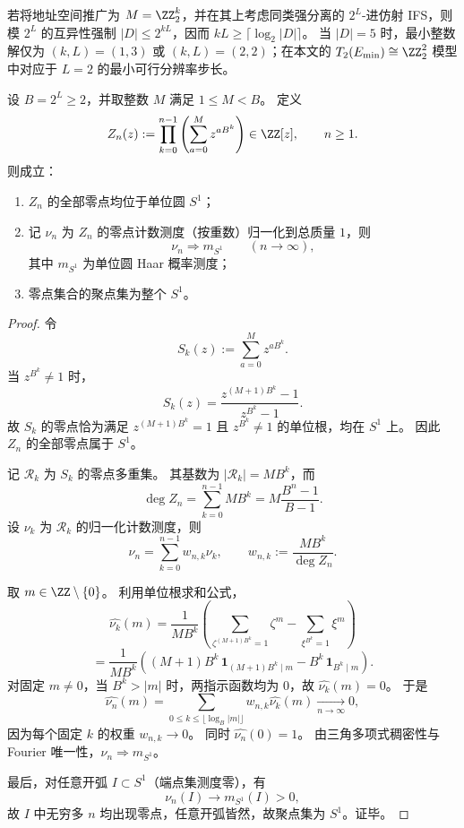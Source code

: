 \begin{remark}[强分离资源的离散门槛]\label{rem:conclusion-godel-leyang-five-digit-quantization}
若将地址空间推广为 \(M=\ZZ_2^k\)，并在其上考虑同类强分离的 \(2^L\)-进仿射 IFS，则模 \(2^L\) 的互异性强制 \(|D|\le 2^{kL}\)，因而 \(kL\ge \lceil \log_2|D|\rceil\)。
当 \(|D|=5\) 时，最小整数解仅为 \((k,L)=(1,3)\) 或 \((k,L)=(2,2)\)；在本文的 \(T_2(E_{\min})\cong\ZZ_2^2\) 模型中对应于 \(L=2\) 的最小可行分辨率步长。
\end{remark}

\begin{theorem}\label{thm:conclusion-godel-leyang-resolution-tower-circle-law}
设 \(B=2^L\ge 2\)，并取整数 \(M\) 满足 \(1\le M<B\)。
定义
\begin{equation}\label{eq:conclusion-godel-leyang-resolution-partition-poly}
Z_n(z):=\prod_{k=0}^{n-1}\left(\sum_{a=0}^{M}z^{aB^k}\right)\in\ZZ[z],\qquad n\ge 1.
\end{equation}
则成立：
\begin{enumerate}
  \item \(Z_n\) 的全部零点均位于单位圆 \(S^1\)；
  \item 记 \(\nu_n\) 为 \(Z_n\) 的零点计数测度（按重数）归一化到总质量 \(1\)，则
  \begin{equation}\label{eq:conclusion-godel-leyang-zeros-weak-limit}
  \nu_n\Longrightarrow m_{S^1}\qquad(n\to\infty),
  \end{equation}
  其中 \(m_{S^1}\) 为单位圆 Haar 概率测度；
  \item 零点集合的聚点集为整个 \(S^1\)。
\end{enumerate}
\end{theorem}
\begin{proof}
令
\[
S_k(z):=\sum_{a=0}^{M}z^{aB^k}.
\]
当 \(z^{B^k}\neq 1\) 时，
\[
S_k(z)=\frac{z^{(M+1)B^k}-1}{z^{B^k}-1}.
\]
故 \(S_k\) 的零点恰为满足 \(z^{(M+1)B^k}=1\) 且 \(z^{B^k}\neq 1\) 的单位根，均在 \(S^1\) 上。
因此 \(Z_n\) 的全部零点属于 \(S^1\)。

记 \(\mathcal R_k\) 为 \(S_k\) 的零点多重集。
其基数为 \(|\mathcal R_k|=MB^k\)，而
\[
\deg Z_n=\sum_{k=0}^{n-1}MB^k=M\frac{B^n-1}{B-1}.
\]
设 \(\nu_k\) 为 \(\mathcal R_k\) 的归一化计数测度，则
\[
\nu_n=\sum_{k=0}^{n-1}w_{n,k}\nu_k,\qquad
w_{n,k}:=\frac{MB^k}{\deg Z_n}.
\]

取 \(m\in\ZZ\setminus\{0\}\)。
利用单位根求和公式，
\[
\widehat{\nu_k}(m)
=\frac{1}{MB^k}
\left(
\sum_{\zeta^{(M+1)B^k}=1}\zeta^m
-\sum_{\xi^{B^k}=1}\xi^m
\right)
\]
\[
=\frac{1}{MB^k}
\left(
(M+1)B^k\,\mathbf 1_{(M+1)B^k\mid m}
-B^k\,\mathbf 1_{B^k\mid m}
\right).
\]
对固定 \(m\neq 0\)，当 \(B^k>|m|\) 时，两指示函数均为 \(0\)，故 \(\widehat{\nu_k}(m)=0\)。
于是
\[
\widehat{\nu_n}(m)
=\sum_{0\le k\le \lfloor \log_B|m|\rfloor}w_{n,k}\widehat{\nu_k}(m)\xrightarrow[n\to\infty]{}0,
\]
因为每个固定 \(k\) 的权重 \(w_{n,k}\to 0\)。
同时 \(\widehat{\nu_n}(0)=1\)。
由三角多项式稠密性与 Fourier 唯一性，\(\nu_n\Rightarrow m_{S^1}\)。

最后，对任意开弧 \(I\subset S^1\)（端点集测度零），有
\[
\nu_n(I)\to m_{S^1}(I)>0,
\]
故 \(I\) 中无穷多 \(n\) 均出现零点，任意开弧皆然，故聚点集为 \(S^1\)。证毕。
\end{proof}

